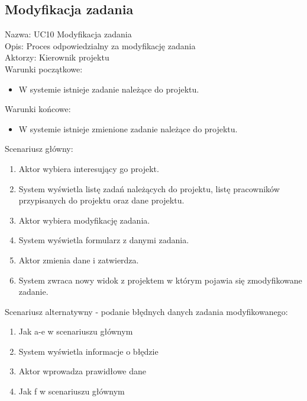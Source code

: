 \subsection{Modyfikacja zadania}
Nazwa: UC10 Modyfikacja zadania\\
Opis: Proces odpowiedzialny za modyfikację zadania\\
Aktorzy: Kierownik projektu \\
Warunki początkowe:
\begin{itemize}
\item W systemie istnieje zadanie należące do projektu.
\end{itemize}
Warunki końcowe:
\begin{itemize}
\item W systemie istnieje zmienione zadanie należące do projektu.
\end{itemize}
Scenariusz główny:
\begin{enumerate}
\item Aktor wybiera interesujący go projekt.
\item System wyświetla listę zadań należących do projektu, listę pracowników przypisanych do projektu oraz dane projektu.
\item Aktor wybiera modyfikację zadania.
\item System wyświetla formularz z danymi zadania.
\item Aktor zmienia dane i zatwierdza.
\item System zwraca nowy widok z projektem w którym pojawia się zmodyfikowane zadanie.
\end{enumerate}
Scenariusz alternatywny - podanie błędnych danych zadania modyfikowanego: 
\begin{enumerate}
\item Jak a-e w scenariuszu głównym
\item System wyświetla informacje o błędzie
\item Aktor wprowadza prawidłowe dane
\item Jak f w scenariuszu głównym
\end{enumerate}

